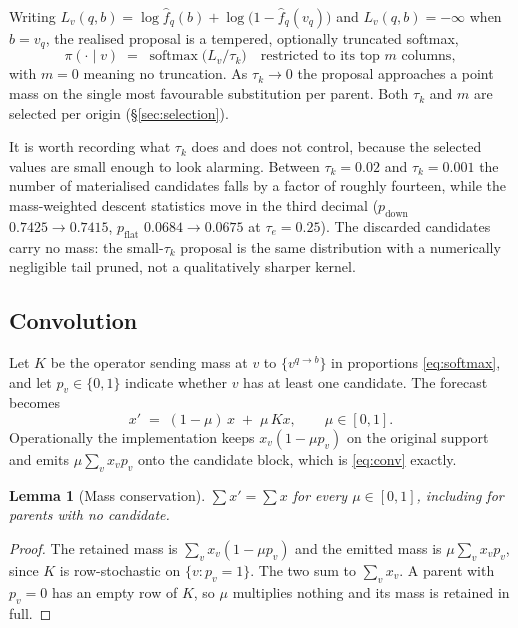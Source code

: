 \documentclass[11pt]{article}
\newtheorem{lemma}{Lemma}
\theoremstyle{remark}
\newcommand{\1}{\mathbf{1}}
\begin{document}
Writing $L_v(q,b) = \log \hat f_q(b) + \log\bigl(1 - \hat f_q(v_q)\bigr)$ and
$L_v(q,b) = -\infty$ when $b = v_q$, the realised proposal is a tempered, optionally
truncated softmax,
\begin{equation}
  \pi(\cdot \mid v) \;=\; \operatorname{softmax}\bigl(L_v / \tau_k\bigr)
  \quad\text{restricted to its top } m \text{ columns},
  \label{eq:softmax}
\end{equation}
with $m = 0$ meaning no truncation. As $\tau_k \to 0$ the proposal approaches a point mass
on the single most favourable substitution per parent. Both $\tau_k$ and $m$ are selected
per origin (\S\ref{sec:selection}).

It is worth recording what $\tau_k$ does and does not control, because the selected values
are small enough to look alarming. Between $\tau_k = 0.02$ and $\tau_k = 0.001$ the number
of materialised candidates falls by a factor of roughly fourteen, while the mass-weighted
descent statistics move in the third decimal ($p_{\mathrm{down}}$ $0.7425 \to 0.7415$,
$p_{\mathrm{flat}}$ $0.0684 \to 0.0675$ at $\tau_e = 0.25$). The discarded candidates carry
no mass: the small-$\tau_k$ proposal is the same distribution with a numerically negligible
tail pruned, not a qualitatively sharper kernel.

\subsection{Convolution}

Let $K$ be the operator sending mass at $v$ to $\{v^{q\to b}\}$ in proportions
\eqref{eq:softmax}, and let $p_v \in \{0,1\}$ indicate whether $v$ has at least one
candidate. The forecast becomes
\begin{equation}
  \boxed{\; x' \;=\; (1-\mu)\,x \;+\; \mu\, K x , \qquad \mu \in [0,1]. \;}
  \label{eq:conv}
\end{equation}
Operationally the implementation keeps $x_v(1 - \mu p_v)$ on the original support and
emits $\mu \sum_v x_v p_v$ onto the candidate block, which is \eqref{eq:conv} exactly.

\begin{lemma}[Mass conservation]
$\sum x' = \sum x$ for every $\mu \in [0,1]$, including for parents with no candidate.
\end{lemma}
\begin{proof}
The retained mass is $\sum_v x_v(1 - \mu p_v)$ and the emitted mass is
$\mu\sum_v x_v p_v$, since $K$ is row-stochastic on $\{v : p_v = 1\}$. The two sum to
$\sum_v x_v$. A parent with $p_v = 0$ has an empty row of $K$, so $\mu$ multiplies nothing
and its mass is retained in full.
\end{proof}
\end{document}
